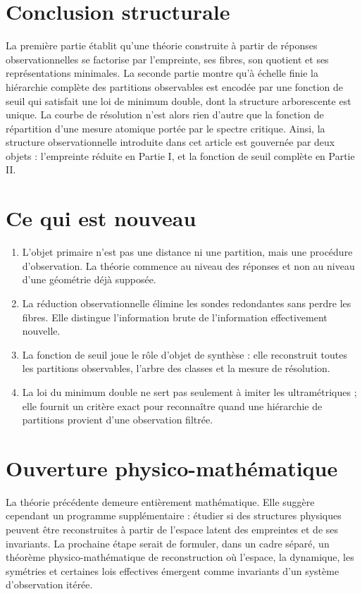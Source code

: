 \documentclass[11pt,a4paper]{article}
\begin{document}
\section{Conclusion structurale}

La première partie établit qu'une théorie construite à partir de réponses observationnelles se factorise par l'empreinte, ses fibres, son quotient et ses représentations minimales. La seconde partie montre qu'à échelle finie la hiérarchie complète des partitions observables est encodée par une fonction de seuil qui satisfait une loi de minimum double, dont la structure arborescente est unique. La courbe de résolution n'est alors rien d'autre que la fonction de répartition d'une mesure atomique portée par le spectre critique. Ainsi, la structure observationnelle introduite dans cet article est gouvernée par deux objets : l'empreinte réduite en Partie I, et la fonction de seuil complète en Partie II.

\section{Ce qui est nouveau}

\begin{enumerate}[label=\arabic*.]
\item L'objet primaire n'est pas une distance ni une partition, mais une procédure d'observation. La théorie commence au niveau des réponses et non au niveau d'une géométrie déjà supposée.
\item La réduction observationnelle élimine les sondes redondantes sans perdre les fibres. Elle distingue l'information brute de l'information effectivement nouvelle.
\item La fonction de seuil joue le rôle d'objet de synthèse : elle reconstruit toutes les partitions observables, l'arbre des classes et la mesure de résolution.
\item La loi du minimum double ne sert pas seulement à imiter les ultramétriques ; elle fournit un critère exact pour reconnaître quand une hiérarchie de partitions provient d'une observation filtrée.
\end{enumerate}

\section{Ouverture physico-mathématique}

La théorie précédente demeure entièrement mathématique. Elle suggère cependant un programme supplémentaire : étudier si des structures physiques peuvent être reconstruites à partir de l'espace latent des empreintes et de ses invariants. La prochaine étape serait de formuler, dans un cadre séparé, un théorème physico-mathématique de reconstruction où l'espace, la dynamique, les symétries et certaines lois effectives émergent comme invariants d'un système d'observation itérée.
\end{document}
